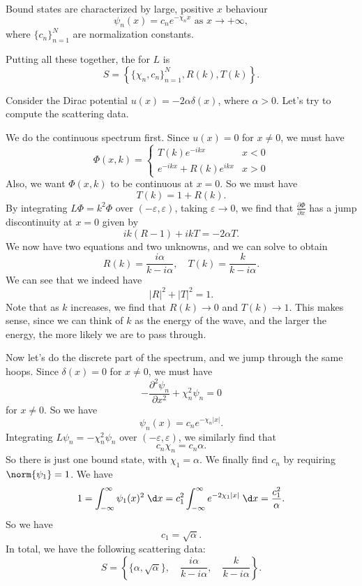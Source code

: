 \documentclass[a4paper]{article}
\begin{document}
Bound states are characterized by large, positive $x$ behaviour
\[
  \psi_n(x) = c_n e^{-\chi_n x}\text{ as }x \to +\infty,
\]
where $\{c_n\}_{n = 1}^N$ are normalization constants.

Putting all these together, the  for $L$ is
\[
  S = \left\{\{\chi_n, c_n\}_{n = 1}^N, R(k), T(k)\right\}.
\]
\begin{eg}
  Consider the Dirac potential $u(x) = - 2 \alpha \delta(x)$, where $\alpha > 0$. Let's try to compute the scattering data.

  We do the continuous spectrum first. Since $u(x) = 0$ for $x \not= 0$, we must have
  \[
    \Phi(x, k) =
    \begin{cases}
      T(k) e^{-ikx} & x < 0\\
      e^{-ikx} + R(k) e^{ikx} & x > 0
    \end{cases}
  \]
  Also, we want $\Phi(x, k)$ to be continuous at $x = 0$. So we must have
  \[
    T(k) = 1 + R(k).
  \]
  By integrating $L\Phi = k^2 \Phi$ over $(-\varepsilon, \varepsilon)$, taking $\varepsilon \to 0$, we find that $\frac{\partial \Phi}{\partial x}$ has a jump discontinuity at $x = 0$ given by
  \[
    ik(R - 1) + ikT = -2 \alpha T.
  \]
  We now have two equations and two unknowns, and we can solve to obtain
  \[
    R(k) = \frac{i\alpha}{k - i\alpha},\quad T(k) = \frac{k}{k - i \alpha}.
  \]
  We can see that we indeed have
  \[
    |R|^2 + |T|^2 = 1.
  \]
  Note that as $k$ increases, we find that $R(k) \to 0$ and $T(k) \to 1$. This makes sense, since we can think of $k$ as the energy of the wave, and the larger the energy, the more likely we are to pass through.

  Now let's do the discrete part of the spectrum, and we jump through the same hoops. Since $\delta(x) = 0$ for $x \not= 0$, we must have
  \[
    -\frac{\partial^2 \psi_n}{\partial x^2} + \chi_n^2 \psi_n = 0
  \]
  for $x \not= 0$. So we have
  \[
    \psi_n(x) = c_n e^{- \chi_n |x|}.
  \]
  Integrating $L\psi_n = - \chi_n^2 \psi_n$ over $(-\varepsilon, \varepsilon)$, we similarly find that
  \[
    c_n \chi_n = c_n \alpha.
  \]
  So there is just one bound state, with $\chi_1 = \alpha$. We finally find $c_n$ by requiring $\norm{\psi_1} = 1$. We have
  \[
    1 = \int_{-\infty}^\infty \psi_1(x)^2 \;\d x = c_1^2 \int_{-\infty}^\infty e^{-2 \chi_1|x|}\;\d x = \frac{c_1^2}{\alpha}.
  \]
  So we have
  \[
    c_1 = \sqrt{\alpha}.
  \]
  In total, we have the following scattering data:
  \[
    S = \left\{\{\alpha, \sqrt{\alpha}\},\quad \frac{i\alpha}{k - i \alpha},\quad \frac{k}{k - i\alpha}\right\}.
  \]
\end{eg}
\end{document}
